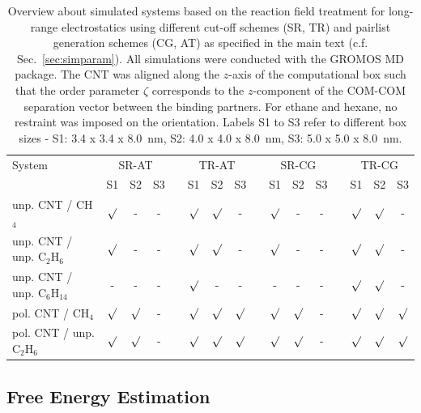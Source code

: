 \documentclass[9pt,lessons,pubversion]{livecoms}
\begin{document}
\begin{table}[ht]
\caption{\label{tbl:overview_RF}
Overview about simulated systems based on the reaction field treatment for long-range electrostatics using different cut-off schemes (SR, TR) and pairlist generation schemes (CG, AT) as 
specified in the main text (c.f. Sec.~\ref{sec:simparam}). 
All simulations were conducted with the GROMOS MD package. 
The CNT was aligned along the $z$-axis of the computational box such that the order parameter $\zeta$ corresponds to the $z$-component of the COM-COM separation vector 
between the binding partners. For ethane and hexane, no restraint was imposed on the orientation. 
Labels S1 to S3 refer to different box sizes - S1: 3.4 x 3.4 x 8.0~nm, S2: 4.0 x 4.0 x 8.0~nm, S3: 5.0 x 5.0 x 8.0~nm.
}
\centering
\begin{tabular}{l ccc c ccc c ccc c ccc}\hline
System & \multicolumn{3}{c}{SR-AT} & & \multicolumn{3}{c}{TR-AT} & & \multicolumn{3}{c}{SR-CG} & & \multicolumn{3}{c}{TR-CG}\\
\cline{2-4} \cline{6-8} \cline{10-12} \cline{14-16}
& S1 & S2 & S3 && S1 & S2 &  S3 && S1 & S2 & S3 && S1 & S2 & S3\\
\hline
unp. CNT / CH$_4$  & $\surd$ & - & - && $\surd$ & $\surd$ & - && $\surd$ & - & - &&  $\surd$ & $\surd$ & -\\
unp. CNT / unp. C$_2$H$_6$ & $\surd$ & - & - && $\surd$ & $\surd$ & - && $\surd$ & - & - &&  $\surd$ & $\surd$ & -\\
unp. CNT / unp. C$_6$H$_{14}$ & - & - & - && $\surd$ & - & - && - & - & - &&  $\surd$ & $\surd$ & -\\
\hline
pol. CNT / CH$_4$ & $\surd$ & $\surd$ & - && $\surd$ & $\surd$ & $\surd$ && $\surd$ & $\surd$ & - &&  $\surd$ & $\surd$ & $\surd$\\
pol. CNT / unp. C$_2$H$_6$ & $\surd$ & $\surd$ & - && $\surd$ & $\surd$ & $\surd$ && $\surd$ & $\surd$ & - &&  $\surd$ & $\surd$ & $\surd$\\
\hline
\end{tabular}
\end{table}


\subsection{Free Energy Estimation}
\label{sec:estimators}
\end{document}

